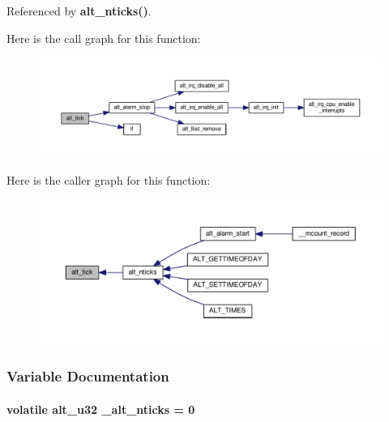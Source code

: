 Referenced by {\bf alt\+\_\+nticks()}.



Here is the call graph for this function\+:
\nopagebreak
\begin{figure}[H]
\begin{center}
\leavevmode
\includegraphics[width=350pt]{d0/d4b/alt__tick_8c_a8717d54d19301f7004086a20324a16ff_cgraph}
\end{center}
\end{figure}




Here is the caller graph for this function\+:
\nopagebreak
\begin{figure}[H]
\begin{center}
\leavevmode
\includegraphics[width=350pt]{d0/d4b/alt__tick_8c_a8717d54d19301f7004086a20324a16ff_icgraph}
\end{center}
\end{figure}




\subsubsection{Variable Documentation}
\paragraph[{\+\_\+alt\+\_\+nticks}]{\setlength{\rightskip}{0pt plus 5cm}volatile {\bf alt\+\_\+u32} \+\_\+alt\+\_\+nticks = 0}\label{alt__tick_8c_a77abfd0b880465ee1511f2d648424428}



